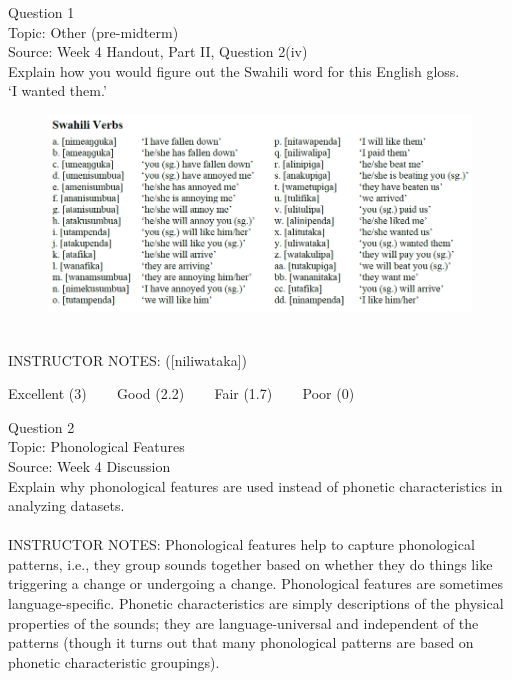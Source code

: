 \documentclass[12pt]{article}
\begin{document}
\begin{center}
\textbf{{\color{blue}{\HUGE START OF EXAM\\}}}

\textbf{{\color{blue}{\HUGE Student ID: 23000\\}}}

\textbf{{\color{blue}{\HUGE 9:10\\}}}

\end{center}
\newpage

{\large Question 1}\\

Topic: Other (pre-midterm)\\
Source: Week 4 Handout, Part II, Question 2(iv)\\

Explain how you would figure out the Swahili word for this English gloss.\\

‘I wanted them.’

\begin{figure}[H]
\includegraphics{../images/swahiliverbs.png}
\end{figure}

~\\
INSTRUCTOR NOTES: ([niliwataka])


\vfill
Excellent (3) ~~~ Good (2.2) ~~~ Fair (1.7) ~~~ Poor (0)
\newpage

{\large Question 2}\\

Topic: Phonological Features\\
Source: Week 4 Discussion\\

Explain why phonological features are used instead of phonetic characteristics in analyzing datasets.\\


~\\
INSTRUCTOR NOTES: Phonological features help to capture phonological patterns, i.e., they group sounds together based on whether they do things like triggering a change or undergoing a change. Phonological features are sometimes language-specific. Phonetic characteristics are simply descriptions of the physical properties of the sounds; they are language-universal and independent of the patterns (though it turns out that many phonological patterns are based on phonetic characteristic groupings).
\end{document}
